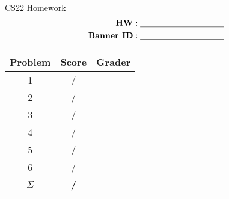 \documentclass[12pt,letterpaper]{article}
\begin{document}
\begin{center}
    \newcommand{\GradeTableHeader}[1]{\quad\textbf{#1}\quad\mbox{}}
    \renewcommand*{\arraystretch}{1}

    {\huge CS22 Homework}\\

    \Large
    \begin{align*}
        \text{\textbf{HW}}&:
        \text{\underline{\hspace{10em}}} \\
        \text{\textbf{Banner ID}}&:
        \text{\underline{\hspace{10em}}}
    \end{align*}
	\newpage
    \begin{tabular}{|c|c|c|}
        \hline
        \GradeTableHeader{Problem}
            & \GradeTableHeader{Score}
            & \GradeTableHeader{Grader} \\
        \hline
        1 & / & ~ \quad\quad\\
        2 & / & ~ \quad\quad\\
        3 & / & ~ \quad\quad\\
        4 & / & ~ \quad\quad\\
        5 & / & ~ \quad\quad\\
        6 & / & ~ \quad\quad\\
        \hline
        $\Sigma$ & \textbf{/} & ~ \\
        \hline
    \end{tabular}

\end{center}
\end{document}
